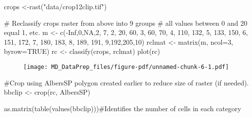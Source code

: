 \documentclass[
  letterpaper,
]{book}
\newenvironment{Shaded}{\begin{snugshade}}{\end{snugshade}}
\newcommand{\AttributeTok}[1]{\textcolor[rgb]{0.40,0.45,0.13}{#1}}
\newcommand{\CommentTok}[1]{\textcolor[rgb]{0.37,0.37,0.37}{#1}}
\newcommand{\ConstantTok}[1]{\textcolor[rgb]{0.56,0.35,0.01}{#1}}
\newcommand{\DecValTok}[1]{\textcolor[rgb]{0.68,0.00,0.00}{#1}}
\newcommand{\FunctionTok}[1]{\textcolor[rgb]{0.28,0.35,0.67}{#1}}
\newcommand{\NormalTok}[1]{\textcolor[rgb]{0.00,0.23,0.31}{#1}}
\newcommand{\OtherTok}[1]{\textcolor[rgb]{0.00,0.23,0.31}{#1}}
\newcommand{\SpecialCharTok}[1]{\textcolor[rgb]{0.37,0.37,0.37}{#1}}
\newcommand{\StringTok}[1]{\textcolor[rgb]{0.13,0.47,0.30}{#1}}
\begin{document}
\begin{Shaded}
\begin{Highlighting}[]
\NormalTok{crops }\OtherTok{\textless{}{-}}\FunctionTok{rast}\NormalTok{(}\StringTok{"data/crop12clip.tif"}\NormalTok{)}

\CommentTok{\# Reclassify crops raster from above into 9 groups}
\CommentTok{\# all values between 0 and 20 equal 1, etc.}
\NormalTok{m }\OtherTok{\textless{}{-}} \FunctionTok{c}\NormalTok{(}\SpecialCharTok{{-}}\ConstantTok{Inf}\NormalTok{,}\DecValTok{0}\NormalTok{,}\ConstantTok{NA}\NormalTok{,}\DecValTok{2}\NormalTok{, }\DecValTok{7}\NormalTok{, }\DecValTok{2}\NormalTok{, }\DecValTok{20}\NormalTok{, }\DecValTok{60}\NormalTok{, }\DecValTok{3}\NormalTok{, }\DecValTok{60}\NormalTok{, }\DecValTok{70}\NormalTok{, }\DecValTok{4}\NormalTok{, }\DecValTok{110}\NormalTok{, }\DecValTok{132}\NormalTok{, }\DecValTok{5}\NormalTok{, }\DecValTok{133}\NormalTok{, }\DecValTok{150}\NormalTok{, }\DecValTok{6}\NormalTok{, }\DecValTok{151}\NormalTok{, }\DecValTok{172}\NormalTok{, }\DecValTok{7}\NormalTok{, }
       \DecValTok{180}\NormalTok{, }\DecValTok{183}\NormalTok{, }\DecValTok{8}\NormalTok{, }\DecValTok{189}\NormalTok{, }\DecValTok{191}\NormalTok{, }\DecValTok{9}\NormalTok{,}\DecValTok{192}\NormalTok{,}\DecValTok{205}\NormalTok{,}\DecValTok{10}\NormalTok{)}
\NormalTok{rclmat }\OtherTok{\textless{}{-}} \FunctionTok{matrix}\NormalTok{(m, }\AttributeTok{ncol=}\DecValTok{3}\NormalTok{, }\AttributeTok{byrow=}\ConstantTok{TRUE}\NormalTok{)}
\NormalTok{rc }\OtherTok{\textless{}{-}} \FunctionTok{classify}\NormalTok{(crops, rclmat)}
\FunctionTok{plot}\NormalTok{(rc)}
\end{Highlighting}
\end{Shaded}

\begin{figure}[H]

{\centering \texttt{[image: MD\_DataPrep\_files/figure-pdf/unnamed-chunk-6-1.pdf]}

}

\end{figure}

\begin{Shaded}
\begin{Highlighting}[]
\CommentTok{\#Crop using AlbersSP polygon created earlier to reduce size of raster (if needed).}
\NormalTok{bbclip }\OtherTok{\textless{}{-}} \FunctionTok{crop}\NormalTok{(rc, AlbersSP)}

\FunctionTok{as.matrix}\NormalTok{(}\FunctionTok{table}\NormalTok{(}\FunctionTok{values}\NormalTok{(bbclip)))}\CommentTok{\#Identifies the number of cells in each category}
\end{Highlighting}
\end{Shaded}
\end{document}
